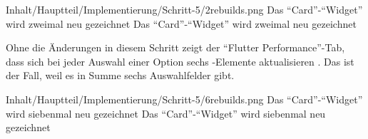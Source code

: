 \begin{alexfigure}{Inhalt/Hauptteil/Implementierung/Schritt-5/2rebuilds.png}
  {Das \enquote{Card}-\enquote{Widget} wird zweimal neu gezeichnet}
  {Das \enquote{Card}-\enquote{Widget} wird zweimal neu gezeichnet}

  \label{fig:Schritt52rebuilds}

\end{alexfigure}

Ohne die Änderungen in diesem Schritt zeigt der \enquote{Flutter Performance}-Tab, dass sich bei jeder Auswahl einer Option sechs -Elemente aktualisieren \Abb{\ref{fig:Schritt56rebuilds}}.
Das ist der Fall, weil es in Summe sechs Auswahlfelder gibt.

\begin{alexfigure}{Inhalt/Hauptteil/Implementierung/Schritt-5/6rebuilds.png}
  {Das \enquote{Card}-\enquote{Widget} wird siebenmal neu gezeichnet}
  {Das \enquote{Card}-\enquote{Widget} wird siebenmal neu gezeichnet}

  \label{fig:Schritt56rebuilds}

\end{alexfigure}
